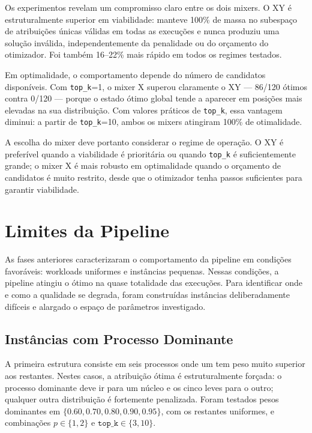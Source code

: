 Os experimentos revelam um compromisso claro entre os dois mixers. O XY é
estruturalmente superior em viabilidade: manteve 100\% de massa no subespaço de
atribuições únicas válidas em todas as execuções e nunca produziu uma solução
inválida, independentemente da penalidade ou do orçamento do otimizador. Foi também
16--22\% mais rápido em todos os regimes testados.

Em optimalidade, o comportamento depende do número de candidatos disponíveis. Com
\texttt{top\_k}=1, o mixer X superou claramente o XY --- 86/120 ótimos contra 0/120 ---
porque o estado ótimo global tende a aparecer em posições mais elevadas na sua
distribuição. Com valores práticos de \texttt{top\_k}, essa vantagem diminui: a
partir de \texttt{top\_k}=10, ambos os mixers atingiram 100\% de otimalidade.

A escolha do mixer deve portanto considerar o regime de operação. O XY é preferível
quando a viabilidade é prioritária ou quando \texttt{top\_k} é suficientemente grande;
o mixer X é mais robusto em optimalidade quando o orçamento de candidatos é muito
restrito, desde que o otimizador tenha passos suficientes para garantir viabilidade.

\section{Limites da Pipeline}
\label{sec:fase4}

As fases anteriores caracterizaram o comportamento da pipeline em condições favoráveis:
workloads uniformes e instâncias pequenas. Nessas condições, a
pipeline atingiu o ótimo na quase totalidade das execuções. Para identificar onde e como
a qualidade se degrada, foram construídas instâncias deliberadamente difíceis e
alargado o espaço de parâmetros investigado. 

\subsection{Instâncias com Processo Dominante}

A primeira estrutura consiste em seis processos onde um tem peso muito
superior aos restantes. Nestes casos, a atribuição ótima é estruturalmente forçada: o
processo dominante deve ir para um núcleo e os cinco leves para o outro; qualquer outra
distribuição é fortemente penalizada. Foram testados pesos dominantes em
$\{0.60, 0.70, 0.80, 0.90, 0.95\}$, com os restantes uniformes, e combinações
$p \in \{1, 2\}$ e $\mathtt{top\_k} \in \{3, 10\}$.

